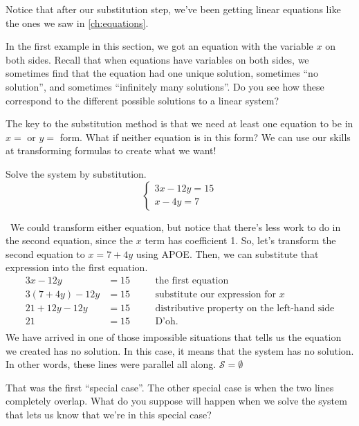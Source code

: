 Notice that after our substitution step, we've been getting linear equations like the ones we saw in \cref{ch:equations}.

In the first example in this section, we got an equation with the variable $x$ on both sides. Recall that when equations have variables on both sides, we sometimes find that the equation had one unique solution, sometimes ``no solution'', and sometimes ``infinitely many solutions''. Do you see how these correspond to the different possible solutions to a linear system?

The key to the substitution method is that we need at least one equation to be in $x=$ or $y=$ form. What if neither equation is in this form? We can use our skills at transforming formulas to create what we want!

\begin{boxex}
Solve the system by substitution.
\[
\left\{%
\begin{array}{l}
3x-12y=15\\
x-4y=7
\end{array}
\right.
\] 

\exsoln\ We could transform either equation, but notice that there's less work to do in the second equation, since the $x$ term has coefficient 1. So, let's transform the second equation to $x=7+4y$ using APOE. Then, we can substitute that expression into the first equation.
\[\begin{aligned}
3x-12y &= 15
&& \quad\text{the first equation}\\
3(7+4y)-12y &= 15
&& \quad\text{substitute our expression for $x$}\\
21+12y-12y &= 15
&& \quad\text{distributive property on the left-hand side}\\
21 &= 15
&& \quad\text{D'oh.}\\
\end{aligned}\]
We have arrived in one of those impossible situations that tells us the equation we created has no solution. In this case, it means that the system has no solution. In other words, these lines were parallel all along. $\mathcal{S}=\emptyset$
\end{boxex}

That was the first ``special case''. The other special case is when the two lines completely overlap. What do you suppose will happen when we solve the system that lets us know that we're in this special case?

